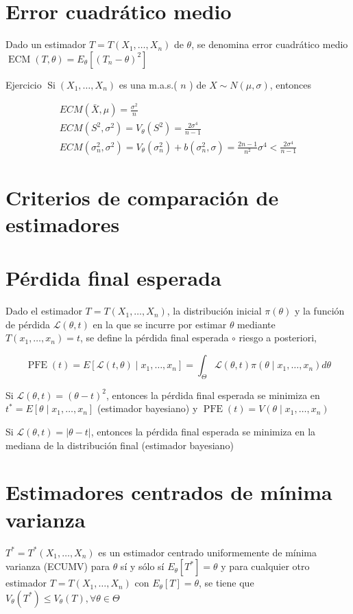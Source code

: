 \section*{Error cuadrático medio}
Dado un estimador $T=T\left(X_{1}, \ldots, X_{n}\right)$ de $\theta$, se denomina error cuadrático medio $\operatorname{ECM}(T, \theta)=E_{\theta}\left[\left(T_{n}-\theta\right)^{2}\right]$

Ejercicio $\operatorname{Si}\left(X_{1}, \ldots, X_{n}\right)$ es una m.a.s.( $n$ ) de $X \sim N(\mu, \sigma)$, entonces

$$
	\begin{gathered}
		E C M(\bar{X}, \mu)=\frac{\sigma^{2}}{n} \\
		E C M\left(S^{2}, \sigma^{2}\right)=V_{\theta}\left(S^{2}\right)=\frac{2 \sigma^{4}}{n-1} \\
		E C M\left(\sigma_{n}^{2}, \sigma^{2}\right)=V_{\theta}\left(\sigma_{n}^{2}\right)+b\left(\sigma_{n}^{2}, \sigma\right)=\frac{2 n-1}{n^{2}} \sigma^{4}<\frac{2 \sigma^{4}}{n-1}
	\end{gathered}
$$

\section*{Criterios de comparación de estimadores}
\section*{Pérdida final esperada}
Dado el estimador $T=T\left(X_{1}, \ldots, X_{n}\right)$, la distribución inicial $\pi(\theta)$ y la función de pérdida $\mathcal{L}(\theta, t)$ en la que se incurre por estimar $\theta$ mediante $T\left(x_{1}, \ldots, x_{n}\right)=t$, se define la pérdida final esperada $\circ$ riesgo a posteriori,

$$
	\operatorname{PFE}(t)=E\left[\mathcal{L}(t, \theta) \mid x_{1}, \ldots, x_{n}\right]=\int_{\Theta} \mathcal{L}(\theta, t) \pi\left(\theta \mid x_{1}, \ldots, x_{n}\right) d \theta
$$

Si $\mathcal{L}(\theta, t)=(\theta-t)^{2}$, entonces la pérdida final esperada se minimiza en $t^{*}=E\left[\theta \mid x_{1}, \ldots, x_{n}\right]$ (estimador bayesiano) y $\operatorname{PFE}(t)=V\left(\theta \mid x_{1}, \ldots, x_{n}\right)$

Si $\mathcal{L}(\theta, t)=|\theta-t|$, entonces la pérdida final esperada se minimiza en la mediana de la distribución final (estimador bayesiano)

\section*{Estimadores centrados de mínima varianza}
$T^{*}=T^{*}\left(X_{1}, \ldots, X_{n}\right)$ es un estimador centrado uniformemente de mínima varianza (ECUMV) para $\theta$ sí y sólo sí $E_{\theta}\left[T^{*}\right]=\theta$ y para cualquier otro estimador $T=T\left(X_{1}, \ldots, X_{n}\right)$ con $E_{\theta}[T]=\theta$, se tiene que $V_{\theta}\left(T^{*}\right) \leq V_{\theta}(T), \forall \theta \in \Theta$

